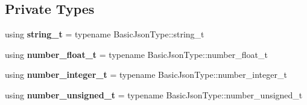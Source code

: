 \subsection*{Private Types}
\begin{DoxyCompactItemize}
\item 
\mbox{\label{classnlohmann_1_1detail_1_1serializer_ad08aa54fac1dd0a453320c54137d45ba}} 
using {\bfseries string\+\_\+t} = typename Basic\+Json\+Type\+::string\+\_\+t
\item 
\mbox{\label{classnlohmann_1_1detail_1_1serializer_a460c6794fbabbb2ae83380e987a6c030}} 
using {\bfseries number\+\_\+float\+\_\+t} = typename Basic\+Json\+Type\+::number\+\_\+float\+\_\+t
\item 
\mbox{\label{classnlohmann_1_1detail_1_1serializer_ae7b1df1c70bdec1371f297567726a198}} 
using {\bfseries number\+\_\+integer\+\_\+t} = typename Basic\+Json\+Type\+::number\+\_\+integer\+\_\+t
\item 
\mbox{\label{classnlohmann_1_1detail_1_1serializer_a16c7b7a726a38ff0c06dce7ba7968391}} 
using {\bfseries number\+\_\+unsigned\+\_\+t} = typename Basic\+Json\+Type\+::number\+\_\+unsigned\+\_\+t
\end{DoxyCompactItemize}
